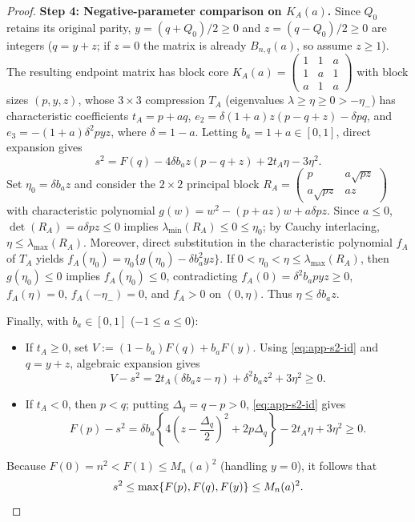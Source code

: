 \documentclass[11pt,reqno]{article}
\theoremstyle{definition}
\begin{document}
\begin{proof}
\medskip\noindent\textbf{Step 4: Negative-parameter comparison on $K_A(a)$.}
Since $Q_0$ retains its original parity, $y = (q + Q_0)/2 \ge 0$ and $z = (q - Q_0)/2 \ge 0$ are integers ($q = y + z$; if $z = 0$ the matrix is already $B_{n, q}(a)$, so assume $z \ge 1$). The resulting endpoint matrix has block core $K_A(a) = \begin{pmatrix} 1 & 1 & a \\ 1 & a & 1 \\ a & 1 & a \end{pmatrix}$ with block sizes $(p, y, z)$, whose $3 \times 3$ compression $T_A$ (eigenvalues $\lambda \ge \eta \ge 0 > -\eta_-$) has characteristic coefficients $t_A = p + aq$, $e_2 = \delta(1+a)z(p - q + z) - \delta pq$, and $e_3 = -(1+a)\delta^2 pyz$, where $\delta = 1 - a$. Letting $b_a = 1 + a \in [0, 1]$, direct expansion gives
\begin{equation}\label{eq:app-s2-id}
s^2 = F(q) - 4\delta b_a z(p - q + z) + 2t_A \eta - 3\eta^2.
\end{equation}
Set $\eta_0 = \delta b_a z$ and consider the $2 \times 2$ principal block $R_A = \begin{pmatrix} p & a\sqrt{pz} \\ a\sqrt{pz} & az \end{pmatrix}$ with characteristic polynomial $g(w) = w^2 - (p + az)w + a\delta pz$. Since $a \le 0$, $\det(R_A) = a\delta pz \le 0$ implies $\lambda_{\min}(R_A) \le 0 \le \eta_0$; by Cauchy interlacing, $\eta \le \lambda_{\max}(R_A)$. Moreover, direct substitution in the characteristic polynomial $f_A$ of $T_A$ yields $f_A(\eta_0) = \eta_0\{g(\eta_0) - \delta b_a^2 y z\}$. If $0 < \eta_0 < \eta \le \lambda_{\max}(R_A)$, then $g(\eta_0) \le 0$ implies $f_A(\eta_0) \le 0$, contradicting $f_A(0) = \delta^2 b_a p y z \ge 0$, $f_A(\eta) = 0$, $f_A(-\eta_-) = 0$, and $f_A > 0$ on $(0, \eta)$. Thus $\eta \le \delta b_a z$.

Finally, with $b_a \in [0, 1]$ ($-1 \le a \le 0$):
\begin{itemize}
    \item If $t_A \ge 0$, set $V := (1-b_a)F(q) + b_a F(y)$. Using \eqref{eq:app-s2-id} and $q = y + z$, algebraic expansion gives
    \[
    V - s^2 = 2t_A(\delta b_a z - \eta) + \delta^2 b_a z^2 + 3\eta^2 \ge 0.
    \]
    \item If $t_A < 0$, then $p < q$; putting $\Delta_q = q - p > 0$, \eqref{eq:app-s2-id} gives
    \[
    F(p) - s^2 = \delta b_a \left\{4\left(z - \frac{\Delta_q}{2}\right)^2 + 2p\Delta_q\right\} - 2t_A\eta + 3\eta^2 \ge 0.
    \]
\end{itemize}
Because $F(0) = n^2 < F(1) \le M_n(a)^2$ (handling $y = 0$), it follows that
\[
s^2 \le \max\{F(p), F(q), F(y)\} \le M_n(a)^2. \qedhere
\]
\end{proof}
\end{document}
